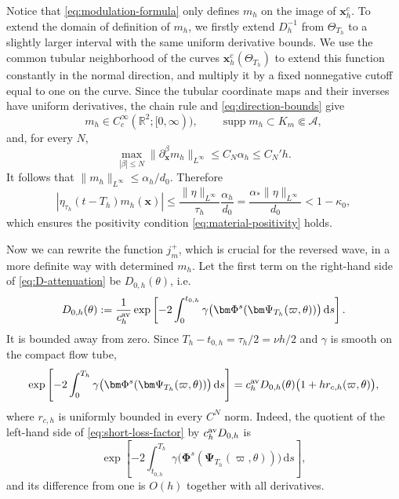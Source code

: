 \documentclass[11pt,reqno]{amsart}
\newcommand{\dd}{\,\mathrm{d}}
\newcommand{\supp}{\operatorname{supp}}
\numberwithin{equation}{section}
\begin{document}
Notice that \eqref{eq:modulation-formula} only defines $m_h$ on the image of $\bm{x}_h^c$. To extend the domain of definition of $m_h$, we firstly extend $D_h^{-1}$ from $\Theta_{T_h}$ to a slightly larger interval with the same uniform derivative bounds. We use the common tubular neighborhood of the curves $\bm x_h^c(\Theta_{T_h})$ to extend this function constantly in the normal direction, and multiply it by a fixed nonnegative cutoff equal to one on the curve. Since the tubular coordinate maps and their inverses have uniform derivatives, the chain rule and \eqref{eq:direction-bounds} give
\begin{equation*}
 m_h\in C_c^\infty(\mathbb R^2;[0,\infty)),
 \qquad
 \supp m_h\subset K_m\Subset\mathcal A,
\end{equation*}
and, for every $N$,
\begin{equation}\label{eq:mh-derivative-bound}
 \max_{|\beta|\le N}
 \|\partial_{\bm x}^{\beta}m_h\|_{L^\infty}
 \le C_N\alpha_h\le C_N'h.
\end{equation}
It follows that $\|m_h\|_{L^\infty}\le\alpha_h/d_0$. Therefore
\begin{equation*}
 |\eta_{\tau_h}(t-T_h)m_h(\bm x)|
 \le\frac{\|\eta\|_{L^\infty}}{\tau_h}
 \frac{\alpha_h}{d_0}
 =\frac{\alpha_*\|\eta\|_{L^\infty}}{d_0}<1-\kappa_0,
\end{equation*}
which ensures the positivity condition \eqref{eq:material-positivity} holds.

Now we can rewrite the function $j_m^+$, which is crucial for the reversed wave, in a more definite way with determined $m_h$. Let the first term on the right-hand side of \eqref{eq:D-attenuation} be $D_{0,h}(\theta)$, i.e.
$$
D_{0,h}(\theta):= \frac1{c_h^{\rm av}}\exp\left[-2\int_0^{t_{0,h}}
 \gamma\bigl(\bm\Phi^s(\bm\Psi_{T_h}(\varpi,\theta))\bigr)\dd s\right].
$$
It is bounded away from zero. Since $T_h-t_{0,h}=\tau_h/2=\nu h/2$ and $\gamma$ is smooth on the compact flow tube,
\begin{equation}\label{eq:short-loss-factor}
 \exp\left[-2\int_0^{T_h}\gamma\bigl(\bm\Phi^s(\bm\Psi_{T_h}(\varpi,\theta))\bigr)\dd s\right]
 =c_h^{\rm av}D_{0,h}(\theta)\bigl(1+h r_{c,h}(\varpi,\theta)\bigr),
\end{equation}
where $r_{c,h}$ is uniformly bounded in every $C^N$ norm. Indeed, the quotient of the left-hand side of \eqref{eq:short-loss-factor} by
$c_h^{\rm av}D_{0,h}$ is
\begin{equation*}
 \exp\left[-2\int_{t_{0,h}}^{T_h}\gamma\bigl(\bm\Phi^s(\bm\Psi_{T_h}(\varpi,\theta))\bigr)\dd s\right],
\end{equation*}
and its difference from one is $O(h)$ together with all derivatives.
\end{document}
